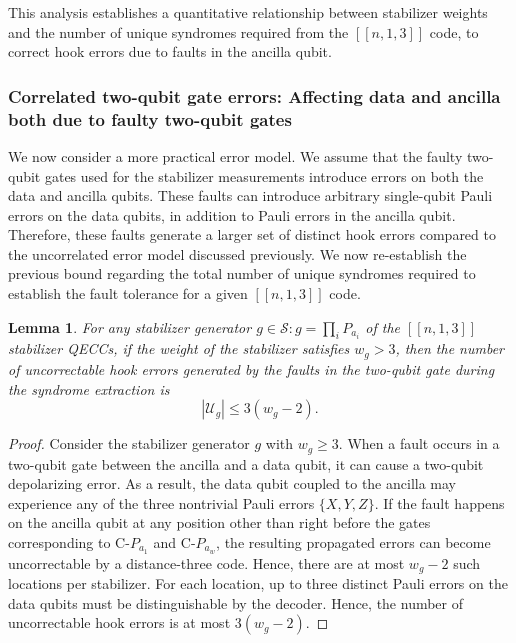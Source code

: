 \documentclass[reprint, amsmath,amssymb, aps,pra,
 floatfix,
]{revtex4-2}
\newtheorem{lemma}[theorem]{Lemma}
\begin{document}
\noindent This analysis establishes a quantitative relationship between stabilizer weights and the number of unique syndromes required from the $[[n,1,3]]$ code, to correct hook errors due to faults in the ancilla qubit.
\subsubsection{Correlated two-qubit gate errors: Affecting data and ancilla both due to faulty two-qubit gates}
\noindent We now consider a more practical error model.
We assume that the faulty two-qubit gates used for the stabilizer measurements introduce errors on both the data and ancilla qubits.
These faults can introduce arbitrary single-qubit Pauli errors on the data qubits, in addition to Pauli errors in the ancilla qubit.
Therefore, these faults generate a larger set of distinct hook errors compared to the uncorrelated error model discussed previously.
We now re-establish the previous bound regarding the total number of unique syndromes required to establish the fault tolerance for a given $[[n,1,3]]$ code.
\begin{lemma}
\label{lemma:two qubit error}
For any stabilizer generator $g \in \mathcal{S}: g= \prod_{i} P_{a_i}$ of the \texorpdfstring{$[[n,1,3]]$}{[[n,1,3]]} stabilizer QECCs, if the weight of the stabilizer satisfies $w_g > 3$, then the number of uncorrectable hook errors generated by the faults in the two-qubit gate during the syndrome extraction is 
\[
|\mathcal{U}_g|\leq 3(w_g-2).
\]
\end{lemma}
\begin{proof}
Consider the stabilizer generator $g$ with $w_g \geq 3$. 
When a fault occurs in a two-qubit gate between the ancilla and a data qubit, it can cause a two-qubit depolarizing error.
As a result, the data qubit coupled to the ancilla may experience any of the three nontrivial Pauli errors $\{X, Y, Z\}$. 
If the fault happens on the ancilla qubit at any position other than right before the gates corresponding to C-$P_{a_1}$ and C-$P_{a_w}$, the resulting propagated errors can become uncorrectable by a distance-three code.
Hence, there are at most $w_g-2$ such locations per stabilizer.
For each location, up to three distinct Pauli errors on the data qubits must be distinguishable by the decoder.
Hence, the number of uncorrectable hook errors is at most $3(w_g -2)$.  
\end{proof}
\end{document}
